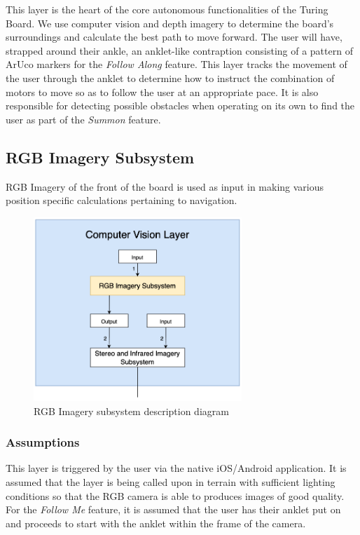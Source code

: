 This layer is the heart of the core autonomous functionalities of the Turing Board. We use computer vision and depth imagery to determine the board's surroundings and calculate the best path to move forward. The user will have, strapped around their ankle, an anklet-like contraption consisting of a pattern of ArUco markers for the \textit{Follow Along} feature. This layer tracks the movement of the user through the anklet to determine how to instruct the combination of motors to move so as to follow the user at an appropriate pace. It is also responsible for detecting possible obstacles when operating on its own to find the user as part of the \textit{Summon} feature. 

\subsection{RGB Imagery Subsystem}
RGB Imagery of the front of the board is used as input in making various position specific calculations pertaining to navigation.

\begin{figure}[h!]
	\centering
 	\includegraphics[width=0.70\textwidth]{images/CV_RGB.png}
 \caption{RGB Imagery subsystem description diagram}
\end{figure}

\subsubsection{Assumptions}
This layer is triggered by the user via the native iOS/Android application. It is assumed that the layer is being called upon in terrain with sufficient lighting conditions so that the RGB camera is able to produces images of good quality. For the \textit{Follow Me} feature, it is assumed that the user has their anklet put on and proceeds to start with the anklet within the frame of the camera. 

